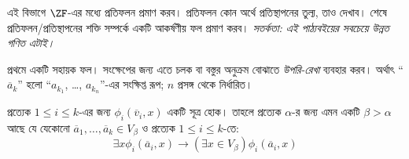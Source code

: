 \documentclass[../../../include/open-logic-section]{subfiles}
\begin{document}

এই বিভাগে $\ZF$-এর মধ্যে প্রতিফলন প্রমাণ করব।
প্রতিফলন কোন অর্থে প্রতিস্থাপনের তুল্য,
তাও দেখাব। শেষে প্রতিফলন/প্রতিস্থাপনের
শক্তি সম্পর্কে একটি আকর্ষণীয় ফল প্রমাণ করব।
\emph{সতর্কতা: এই পাঠ্যবইয়ের সবচেয়ে
উন্নত গণিত এটাই।}

প্রথমে একটি সহায়ক ফল। সংক্ষেপের জন্য
এতে চলক বা বস্তুর অনুক্রম বোঝাতে
\emph{উপরি-রেখা} ব্যবহার করব। অর্থাৎ
``$\overline{a}_k$'' হলো
``$a_{k_1}$, \dots, $a_{k_n}$''-এর
সংক্ষিপ্ত রূপ; $n$ প্রসঙ্গ থেকে নির্ধারিত।

\begin{lem}
প্রত্যেক $1 \leq i \leq k$-এর জন্য
$\phi_i(\overline{v}_i, x)$ একটি সূত্র
হোক। তাহলে প্রত্যেক $\alpha$-র জন্য
এমন একটি $\beta > \alpha$ আছে যে
যেকোনো $\overline{a}_1,
\ldots, \overline{a}_k \in V_\beta$
ও প্রত্যেক $1 \leq i \leq k$-তে:
\[
	\exists x\phi_i(\overline{a}_i, x) \rightarrow (\exists x \in V_\beta) \phi_i(\overline{a}_i, x)
\]
\end{lem}
\end{document}
